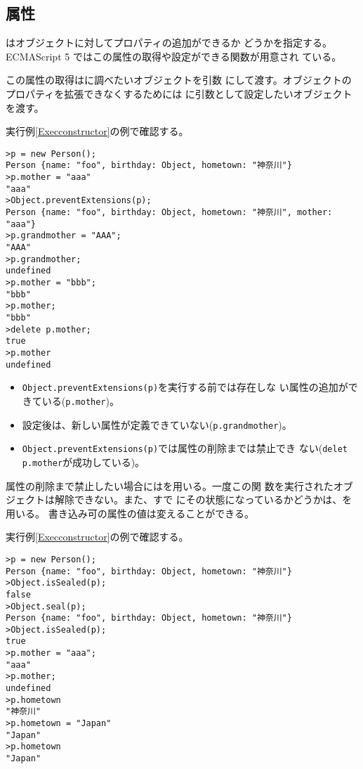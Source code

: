 \subsection{\protect{}属性}
はオブジェクトに対してプロパティの追加ができるか
どうかを指定する。ECMAScript 5 ではこの属性の取得や設定ができる関数が用意され
ている。

この属性の取得はに調べたいオブジェクトを引数
にして渡す。オブジェクトのプロパティを拡張できなくするためには
に引数として設定したいオブジェクトを渡す。
 \begin{Exec}\upshape
  実行例\ref{Execconstructor}の例で確認する。
\begin{Verbatim}
>p = new Person();
Person {name: "foo", birthday: Object, hometown: "神奈川"}
>p.mother = "aaa"
"aaa"
>Object.preventExtensions(p);
Person {name: "foo", birthday: Object, hometown: "神奈川", mother: "aaa"}
>p.grandmother = "AAA";
"AAA"
>p.grandmother;
undefined
>p.mother = "bbb";
"bbb"
>p.mother;
"bbb"
>delete p.mother;
true
>p.mother
undefined
\end{Verbatim}
 \end{Exec}
\begin{itemize}
 \item \texttt{Object.preventExtensions(p)}を実行する前では存在しな
       い属性の追加ができている(\texttt{p.mother})。
 \item 設定後は、新しい属性が定義できていない(\texttt{p.grandmother})。
 \item \texttt{Object.preventExtensions(p)}では属性の削除までは禁止でき
       ない(\texttt{delet p.mother}が成功している)。
\end{itemize}
属性の削除まで禁止したい場合にはを用いる。一度この関
数を実行されたオブジェクトは解除できない。また、すで
にその状態になっているかどうかは、を用いる。
書き込み可の属性の値は変えることができる。
 \begin{Exec}\upshape\label{ExecContined}
  実行例\ref{Execconstructor}の例で確認する。
\begin{Verbatim}
>p = new Person();
Person {name: "foo", birthday: Object, hometown: "神奈川"}
>Object.isSealed(p);
false
>Object.seal(p);
Person {name: "foo", birthday: Object, hometown: "神奈川"}
>Object.isSealed(p);
true
>p.mother = "aaa";
"aaa"
>p.mother;
undefined
>p.hometown
"神奈川"
>p.hometown = "Japan"
"Japan"
>p.hometown
"Japan"
\end{Verbatim}
 \end{Exec}
